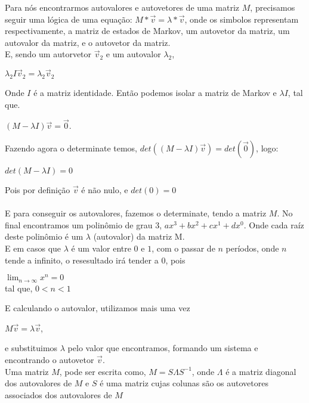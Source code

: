 \documentclass[14pt]{article}
\begin{document}
    Para nós encontrarmos autovalores e autovetores de uma matriz $M$, precisamos seguir uma lógica de uma equação:
$M * \vec{v} = \lambda * \vec{v}$,
onde os simbolos representam respectivamente, a matriz de estados de Markov, um autovetor da matriz, um autovalor da matriz, e o autovetor da matriz. \\

    E, sendo um autorvetor $\vec{v}_2$ e um autovalor $\lambda_2$,
\begin{center}
$\lambda_2 I \vec{v}_2 = \lambda_2 \vec{v}_2$
\end{center}

    Onde $I$ é a matriz identidade.
Então podemos isolar a matriz de Markov e $\lambda I$, tal que.

\begin{center}
$(M-\lambda I)\vec{v} = \vec{0}$.\end{center}

Fazendo agora o determinate temos, 
$det((M-\lambda I)\vec{v}) = det(\vec{0})$, logo:

\begin{center}
    $det(M - \lambda I) = 0$
\end{center}

Pois por definição $\vec{v}$ é não nulo, e $det(0) = 0$\\\\
E para conseguir os autovalores, fazemos o determinate, tendo a matriz $M$. No final encontramos um polinômio de grau 3,  $ax^3 + bx^2 + cx^1 + dx^0$. Onde cada raíz deste polinômio é um $\lambda$ (autovalor) da matriz M.\\

E em casos que $\lambda$ é um valor entre $0$ e $1$, com o passar de $n$ períodos, onde $n$ tende a infinito, o resesultado irá tender a $0$, pois\\
\begin{center}
$\lim_{n\to\infty} x^n = 0$\\ tal que,  $0 < n < 1$\end{center}

E calculando o autovalor, utilizamos mais uma vez\\
\begin{center}
    $M \vec{v} = \lambda \vec{v}$,
\end{center}
e substituimos $\lambda$ pelo valor que encontramos, formando um sistema e encontrando o autovetor $\vec{v}$.\\

Uma matriz $M$, pode ser escrita como, $M = S\Lambda S^{-1}$,
onde $\Lambda$ é a matriz diagonal dos autovalores de $M$ e $S$ é uma matriz cujas colunas são os autovetores associados dos autovalores de $M$\\
\end{document}
